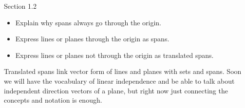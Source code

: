 \documentclass{problemset}
\begin{document}
\begin{lesson}

	Section 1.2

	\begin{itemize}
		\item Explain why spans always go through the origin.
		\item Express lines or planes through the origin as spans.
		\item Express lines or planes not through the origin as translated spans.
	\end{itemize}

	Translated spans link vector form of lines and planes with sets and spans.
	Soon we will have the vocabulary of linear independence and be able to
	talk about independent direction vectors of a plane, but right now just connecting
	the concepts and notation is enough.

\end{lesson}
\end{document}
